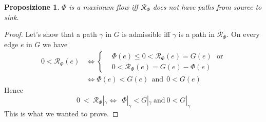 \documentclass{article}
\theoremstyle{plain}
\newtheorem{prop}[teo]{Proposizione}
\theoremstyle{definition}
\theoremstyle{remark}
\begin{document}
\begin{prop}
$\Phi$ is a maximum flow iff $\mathcal{R}_{\Phi}$ does not have paths from source to sink.
\end{prop}
\begin{proof}
Let's show that a path $\gamma$ in $G$ is admissible iff $\gamma$ is a path in $\mathcal{R}_{\Phi}$. On every edge $e$ in $G$ we have
\begin{equation*}
\begin{split}
0<{\mathcal{R}_{\Phi}}(e) &\Leftrightarrow
\begin{cases}
&\Phi(e) \leq 0 < {\mathcal{R}_{\Phi}}(e) = G(e)\ \  \ \text{or} \\
&0 <  {\mathcal{R}_{\Phi}}(e) = G(e) - \Phi(e)
\end{cases}\\
&\Leftrightarrow \Phi(e) < G(e) \ \  \text{and}\  \ 0<G(e)
\end{split}
\end{equation*}
Hence  
\begin{equation*}
0\ <\ {\mathcal{R}_{\Phi}}|_{\gamma} \Leftrightarrow\   \ \Phi|_{\gamma} < G|_{\gamma}\  \text{and}\  0< G|_{\gamma}
\end{equation*}
This is what we wanted to prove.
\end{proof}
\end{document}
